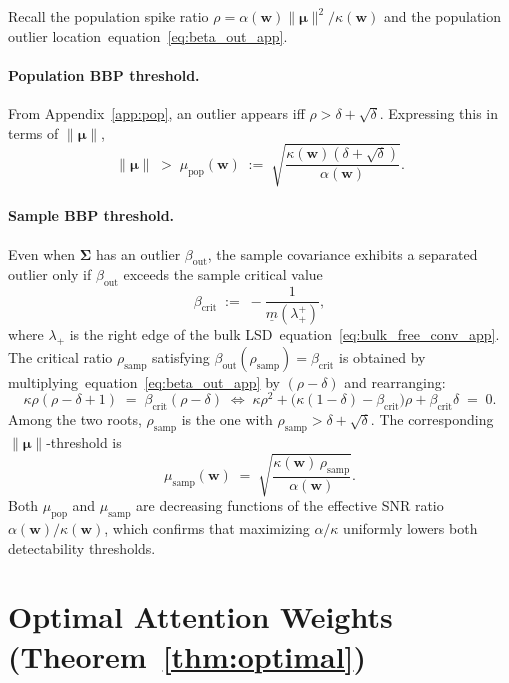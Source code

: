 \documentclass{article}
\def\eqref#1{equation~\ref{#1}}
\def\vmu{{\bm{\mu}}}
\def\vw{{\bm{w}}}
\def\mSigma{{\bm{\Sigma}}}
\begin{document}
Recall the population spike ratio $\rho=\alpha(\vw)\|\vmu\|^2/\kappa(\vw)$ and the population outlier location~\eqref{eq:beta_out_app}.

\paragraph{Population BBP threshold.}
From Appendix~\ref{app:pop}, an outlier appears iff $\rho>\delta+\sqrt\delta$. Expressing this in terms of $\|\vmu\|$,
\begin{equation}\label{eq:mu_pop_app}
    \|\vmu\| \;>\; \mu_\mathrm{pop}(\vw) \;:=\; \sqrt{\frac{\kappa(\vw)(\delta+\sqrt\delta)}{\alpha(\vw)}}.
\end{equation}

\paragraph{Sample BBP threshold.}
Even when $\mSigma$ has an outlier $\beta_\mathrm{out}$, the sample covariance exhibits a separated outlier only if $\beta_\mathrm{out}$ exceeds the sample critical value
\begin{equation}\label{eq:beta_crit_app}
    \beta_\mathrm{crit} \;:=\; -\frac{1}{\underline{m}(\lambda_+^{+})},
\end{equation}
where $\lambda_+$ is the right edge of the bulk LSD~\eqref{eq:bulk_free_conv_app}. The critical ratio $\rho_\mathrm{samp}$ satisfying $\beta_\mathrm{out}(\rho_\mathrm{samp})=\beta_\mathrm{crit}$ is obtained by multiplying~\eqref{eq:beta_out_app} by $(\rho-\delta)$ and rearranging:
\[
    \kappa\rho(\rho-\delta+1) \;=\; \beta_\mathrm{crit}(\rho-\delta)
    \;\Longleftrightarrow\;
    \kappa\rho^2 + \big(\kappa(1-\delta)-\beta_\mathrm{crit}\big)\rho + \beta_\mathrm{crit}\delta \;=\; 0.
\]
Among the two roots, $\rho_\mathrm{samp}$ is the one with $\rho_\mathrm{samp}>\delta+\sqrt\delta$. The corresponding $\|\vmu\|$-threshold is
\begin{equation}\label{eq:mu_samp_app}
    \mu_\mathrm{samp}(\vw) \;=\; \sqrt{\frac{\kappa(\vw)\,\rho_\mathrm{samp}}{\alpha(\vw)}}.
\end{equation}
Both $\mu_\mathrm{pop}$ and $\mu_\mathrm{samp}$ are decreasing functions of the effective SNR ratio $\alpha(\vw)/\kappa(\vw)$, which confirms that maximizing $\alpha/\kappa$ uniformly lowers both detectability thresholds.


\section{Optimal Attention Weights (Theorem~\ref{thm:optimal})}\label{app:optimal}
\end{document}
